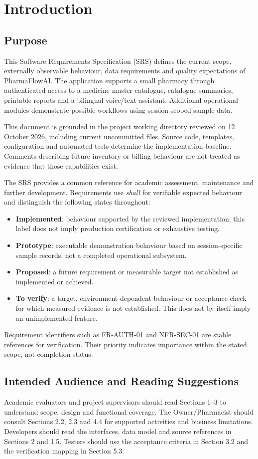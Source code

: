 \documentclass[11pt,a4paper]{article}
\newcommand{\Project}{PharmaFlowAI}
\newcommand{\BaselineDate}{12 October 2026}
\newcommand{\Implemented}{\textbf{Implemented}}
\newcommand{\Prototype}{\textbf{Prototype}}
\newcommand{\Proposed}{\textbf{Proposed}}
\newcommand{\ToVerify}{\textbf{To verify}}
\begin{document}
\section{Introduction}
\subsection{Purpose}
This Software Requirements Specification (SRS) defines the current scope, externally observable behaviour, data requirements and quality expectations of \Project. The application supports a small pharmacy through authenticated access to a medicine master catalogue, catalogue summaries, printable reports and a bilingual voice/text assistant. Additional operational modules demonstrate possible workflows using session-scoped sample data.

This document is grounded in the project working directory reviewed on \BaselineDate, including current uncommitted files. Source code, templates, configuration and automated tests determine the implementation baseline. Comments describing future inventory or billing behaviour are not treated as evidence that those capabilities exist.

The SRS provides a common reference for academic assessment, maintenance and further development. Requirements use \emph{shall} for verifiable expected behaviour and distinguish the following states throughout:
\begin{itemize}
\item \Implemented: behaviour supported by the reviewed implementation; this label does not imply production certification or exhaustive testing.
\item \Prototype: executable demonstration behaviour based on session-specific sample records, not a completed operational subsystem.
\item \Proposed: a future requirement or measurable target not established as implemented or achieved.
\item \ToVerify: a target, environment-dependent behaviour or acceptance check for which measured evidence is not established. This does not by itself imply an unimplemented feature.
\end{itemize}
Requirement identifiers such as FR-AUTH-01 and NFR-SEC-01 are stable references for verification. Their priority indicates importance within the stated scope, not completion status.

\subsection{Intended Audience and Reading Suggestions}
Academic evaluators and project supervisors should read Sections 1--3 to understand scope, design and functional coverage. The Owner/Pharmacist should consult Sections 2.2, 2.3 and 4.4 for supported activities and business limitations. Developers should read the interfaces, data model and source references in Sections 2 and 1.5. Testers should use the acceptance criteria in Section 3.2 and the verification mapping in Section 5.3.
\end{document}

